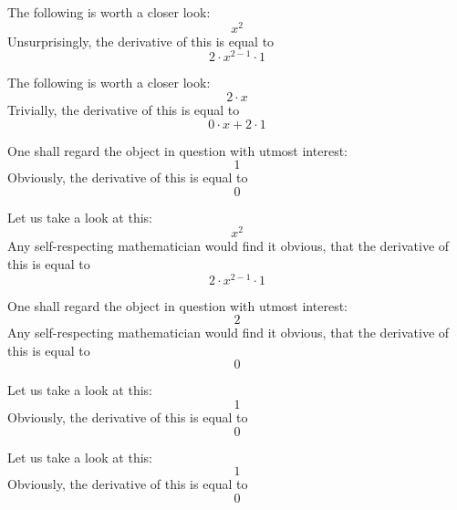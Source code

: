 \documentclass{article}
\begin{document}
The following is worth a closer look:
\begin{equation}
x ^{2 } 
\end{equation}
Unsurprisingly, the derivative of this is equal to
\begin{equation}
2 \cdot x ^{2 - 1 } \cdot 1 
\end{equation}

The following is worth a closer look:
\begin{equation}
2 \cdot x 
\end{equation}
Trivially, the derivative of this is equal to
\begin{equation}
0 \cdot x + 2 \cdot 1 
\end{equation}

One shall regard the object in question with utmost interest:
\begin{equation}
1 
\end{equation}
Obviously, the derivative of this is equal to
\begin{equation}
0 
\end{equation}

Let us take a look at this:
\begin{equation}
x ^{2 } 
\end{equation}
Any self-respecting mathematician would find it obvious, that the derivative of this is equal to
\begin{equation}
2 \cdot x ^{2 - 1 } \cdot 1 
\end{equation}

One shall regard the object in question with utmost interest:
\begin{equation}
2 
\end{equation}
Any self-respecting mathematician would find it obvious, that the derivative of this is equal to
\begin{equation}
0 
\end{equation}

Let us take a look at this:
\begin{equation}
1 
\end{equation}
Obviously, the derivative of this is equal to
\begin{equation}
0 
\end{equation}

Let us take a look at this:
\begin{equation}
1 
\end{equation}
Obviously, the derivative of this is equal to
\begin{equation}
0 
\end{equation}
\end{document}
